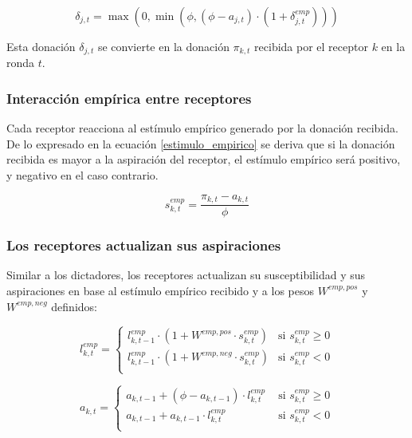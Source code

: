\documentclass[12pt,a4paper]{article}
\begin{document}
\begin{equation}
\delta_{j,t} = \max(0,\min(\phi,(\phi-a_{j,t}) \cdot (1 + \delta_{j,t}^{emp})))
\end{equation}

Esta donación $\delta_{j,t}$ se convierte en la donación $\pi_{k,t}$ recibida por el receptor $k$ en la ronda $t$.

\subsubsection{Interacción empírica entre receptores}

Cada receptor reacciona al estímulo empírico generado por la donación recibida. De lo expresado en la ecuación
\ref{estimulo_empirico} se deriva que si la donación recibida es mayor a la aspiración del receptor, 
el estímulo empírico será positivo, y negativo en el caso contrario.

\begin{equation}
s_{k,t}^{emp} = \frac{\pi_{k,t} - a_{k,t}}{\phi}
\label{estimulo_empirico}
\end{equation}

\subsubsection{Los receptores actualizan sus aspiraciones}

Similar a los dictadores, los receptores actualizan su susceptibilidad y sus aspiraciones en base al estímulo
empírico recibido y a los pesos $W^{emp,pos}$ y $W^{emp,neg}$ definidos:

\begin{equation}
l_{k,t}^{emp} = 
\begin{cases}
l_{k,t-1}^{emp} \cdot (1+W^{emp,pos} \cdot s_{k,t}^{emp}) & \text{si } s_{k,t}^{emp} \geq 0 \\
l_{k,t-1}^{emp} \cdot (1+W^{emp,neg} \cdot s_{k,t}^{emp}) & \text{si } s_{k,t}^{emp} < 0 \\
\end{cases}
\end{equation}

\begin{equation}
a_{k,t} =
\begin{cases}
a_{k,t-1} + (\phi - a_{k,t-1}) \cdot l_{k,t}^{emp} & \text{ si } s_{k,t}^{emp} \geq 0 \\
a_{k,t-1} + a_{k,t-1} \cdot l_{k,t}^{emp} & \text{ si } s_{k,t}^{emp} < 0 \\
\end{cases}
\label{aspiracion_receptor}
\end{equation}
\end{document}
